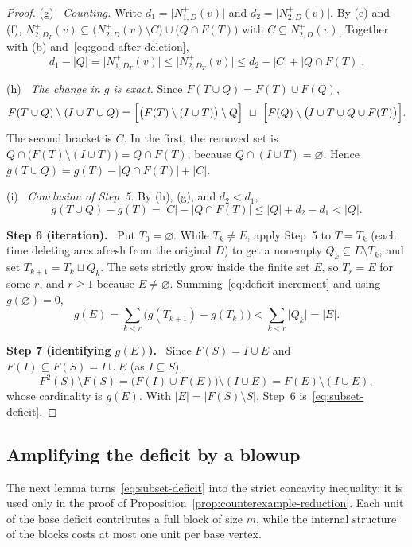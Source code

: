 \documentclass[11pt]{article}
\theoremstyle{remark}
\newcommand{\abs}[1]{\lvert #1\rvert}
\newcommand{\step}[1]{\par\medskip\noindent\textbf{Step #1.}\ }
\newcommand{\substep}[1]{\par\smallskip\noindent\textup{(#1)}\ }
\begin{document}
\begin{proof}
\substep{g} \emph{Counting.}
Write $d_1=\abs{N_{1,D}^+(v)}$ and $d_2=\abs{N_{2,D}^+(v)}$. By (e) and (f),
$N_{2,D_T}^+(v)\subseteq\bigl(N_{2,D}^+(v)\setminus C\bigr)\cup
\bigl(Q\cap F(T)\bigr)$ with $C\subseteq N_{2,D}^+(v)$. Together with (b)
and~\eqref{eq:good-after-deletion},
\[
  d_1-\abs{Q}=\abs{N_{1,D_T}^+(v)}
  \le \abs{N_{2,D_T}^+(v)}
  \le d_2-\abs{C}+\abs{Q\cap F(T)}.
\]

\substep{h} \emph{The change in $g$ is exact.}
Since $F(T\cup Q)=F(T)\cup F(Q)$,
\[
 F(T\cup Q)\setminus(I\cup T\cup Q)
 =\Bigl[\bigl(F(T)\setminus(I\cup T)\bigr)\setminus Q\Bigr]\ \sqcup\
  \Bigl[F(Q)\setminus\bigl(I\cup T\cup Q\cup F(T)\bigr)\Bigr].
\]
The second bracket is $C$. In the first, the removed set is
$Q\cap\bigl(F(T)\setminus(I\cup T)\bigr)=Q\cap F(T)$, because
$Q\cap(I\cup T)=\varnothing$. Hence
$g(T\cup Q)=g(T)-\abs{Q\cap F(T)}+\abs C$.

\substep{i} \emph{Conclusion of Step~5.} By (h), (g), and $d_2<d_1$,
\begin{equation}
\label{eq:deficit-increment}
  g(T\cup Q)-g(T)
  =\abs{C}-\abs{Q\cap F(T)}
  \le \abs{Q}+d_2-d_1
  <\abs{Q}.
\end{equation}

\step{6 (iteration)}
Put $T_0=\varnothing$. While $T_k\ne E$, apply Step~5 to $T=T_k$ (each time
deleting arcs afresh from the original $D$) to get a nonempty
$Q_k\subseteq E\setminus T_k$, and set $T_{k+1}=T_k\sqcup Q_k$. The sets
strictly grow inside the finite set $E$, so $T_r=E$ for some $r$, and
$r\ge1$ because $E\ne\varnothing$. Summing~\eqref{eq:deficit-increment} and
using $g(\varnothing)=0$,
\[
 g(E)=\sum_{k<r}\bigl(g(T_{k+1})-g(T_k)\bigr)<\sum_{k<r}\abs{Q_k}=\abs E .
\]

\step{7 (identifying $g(E)$)}
Since $F(S)=I\cup E$ and $F(I)\subseteq F(S)=I\cup E$ (as $I\subseteq S$),
\[
  F^2(S)\setminus F(S)
  =\bigl(F(I)\cup F(E)\bigr)\setminus(I\cup E)
  =F(E)\setminus(I\cup E),
\]
whose cardinality is $g(E)$. With $\abs E=\abs{F(S)\setminus S}$, Step~6
is~\eqref{eq:subset-deficit}.
\end{proof}

\subsection{Amplifying the deficit by a blowup}

The next lemma turns~\eqref{eq:subset-deficit} into the strict concavity
inequality; it is used only in the proof of
Proposition~\ref{prop:counterexample-reduction}. Each unit of the base deficit
contributes a full block of size $m$, while the internal structure of the
blocks costs at most one unit per base vertex.
\end{document}
